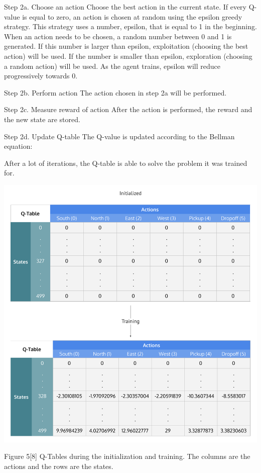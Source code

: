 \documentclass{article}
\begin{document}
Step 2a. Choose an action
Choose the best action in the current state. If every Q-value is equal to zero, an action is chosen at random using the epsilon greedy strategy. This strategy uses a number, epsilon, that is equal to 1 in the beginning. When an action needs to be chosen, a random number between 0 and 1 is generated. If this number is larger than epsilon, exploitation (choosing the best action) will be used. If the number is smaller than epsilon, exploration (choosing a random action) will be used. As the agent trains, epsilon will reduce progressively towards 0.

Step 2b. Perform action
The action chosen in step 2a will be performed.

Step 2c. Measure reward of action
After the action is performed, the reward and the new state are stored. 

Step 2d. Update Q-table 
The Q-value is updated according to the Bellman equation:  


After a lot of iterations, the Q-table is able to solve the problem it was trained for.

\includegraphics[width=\paperwidth]{q_table}

Figure 5[8] Q-Tables during the initialization and training. The columns are the actions and the rows are the states. 
\end{document}
